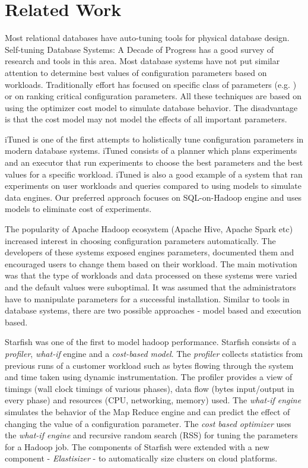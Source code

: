 \section{Related Work}
\label{sec:relatedwork}
Most relational databases have auto-tuning tools for physical database design. 
Self-tuning Database Systems: A Decade of Progress\cite{Chaudhuri:2007:SDS:1325851.1325856}
 has a good survey of research and tools in this area. Most database systems have 
not put similar attention to determine best values of configuration parameters 
based on workloads. Traditionally effort has focused on specific class of parameters 
(e.g.\cite{Storm:2006:ASM:1182635.1164220} ) or on ranking
critical configuration parameters\cite{DBLP:conf/icde/DebnathLM08}. All these techniques
are based on using the optimizer cost model to simulate database behavior. The disadvantage is
that the cost model may not model the effects of all important parameters.

iTuned\cite{Duan:2009:TDC:1687627.1687767} is one of the first attempts to holistically 
tune configuration parameters in modern database systems. iTuned consists of a planner
which plans experiments and an executor that run experiments to choose the best parameters
and the best values for a specific workload. iTuned is also a good example of a system that
ran experiments on user workloads and queries compared to using models to simulate data engines.
Our preferred approach focuses on SQL-on-Hadoop engine and uses models to eliminate cost of experiments.
 
The popularity of Apache Hadoop ecosystem (Apache Hive, Apache Spark etc) increased interest
in choosing configuration parameters automatically. The developers of these systems exposed
engines parameters, documented them and encouraged users to change them based on their workload.
The main motivation was that the type of workloads and data processed on these systems were varied
and the default values were suboptimal. It was assumed that the administrators have to manipulate
parameters for a successful installation. Similar to tools in database systems, there are two possible approaches - model based and execution based.

Starfish\cite{herodotou2011starfish} was one of the first to model hadoop performance. Starfish 
consists of a \textit{profiler}, \textit{what-if} engine and a \textit{cost-based model}\cite{herodotou2011profiling}. 
The \textit{profiler} collects statistics from previous runs of a customer workload 
such as bytes flowing through the system and time taken using dynamic instrumentation. The profiler provides a view of timings (wall clock timings of various phases),
data flow (bytes input/output in every phase) and resources (CPU, networking, memory) used. The \textit{what-if engine} simulates 
the behavior of the Map Reduce engine and can predict the effect of changing the value 
of a configuration parameter. The \textit{cost based optimizer} uses the \textit{what-if engine}
and recursive random search (RSS) for tuning the parameters for a Hadoop job. The components of
Starfish were extended with a new component - \textit{Elastisizer}\cite{Herodotou:2011:NOS:2038916.2038934}
- to automatically size clusters on cloud platforms. 

